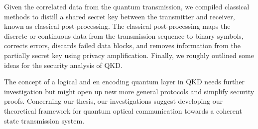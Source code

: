 Given the correlated data from the quantum transmission, we compiled classical methods to distill a shared secret key between the transmitter and receiver, known as classical post-processing. 
The classical post-processing maps the discrete or continuous data from the transmission sequence to binary symbols, corrects errors, discards failed data blocks, and removes information from the partially secret key using privacy amplification.
Finally, we roughly outlined some ideas for the security analysis of QKD.

The concept of a logical and en encoding quantum layer in QKD needs further investigation but might open up new more general protocols and simplify security proofs.
Concerning our thesis, our investigations suggest developing our theoretical framework for quantum optical communication towards a coherent state transmission system.
